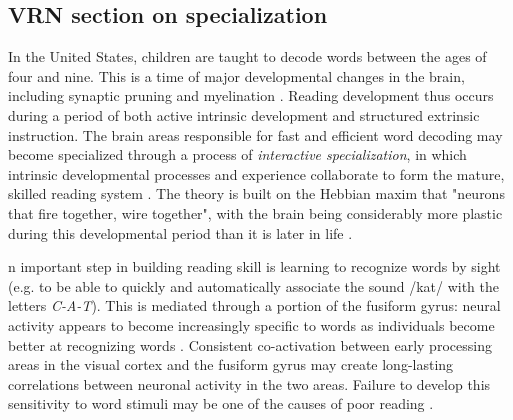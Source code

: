 \subsection{VRN section on specialization}

In the United States, children are taught to decode words between the ages of four and nine. This is a time of major developmental changes in the brain, including synaptic pruning and myelination \cite{Wandell2013}. Reading development thus occurs during a period of both active intrinsic development and structured extrinsic instruction. The brain areas responsible for fast and efficient word decoding may become specialized through a process of \textit{interactive specialization}, in which intrinsic developmental processes and experience collaborate to form the mature, skilled reading system \cite{Johnson2011, Klingberg2014}. The theory is built on the Hebbian maxim that "neurons that fire together, wire together", with the brain being considerably more plastic during this developmental period than it is later in life \cite{Hebb1949}.

n important step in building reading skill is learning to recognize words by sight (e.g. to be able to quickly and automatically associate the sound /kat/ with the letters \textit{C-A-T}). This is mediated through a portion of the fusiform gyrus: neural activity appears to become increasingly specific to words as individuals become better at recognizing words \cite{Mccandliss2003, Schlaggar2007}. Consistent co-activation between early processing areas in the visual cortex and the fusiform gyrus may create long-lasting correlations between neuronal activity in the two areas. Failure to develop this sensitivity to word stimuli may be one of the causes of poor reading \cite{He2013}.  

